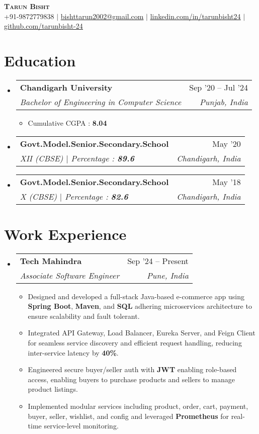 \documentclass[letterpaper,11pt]{article}
\makeatletter
\newcommand{\resumeItem}[1]{
  \item\small{
    {#1 \vspace{-2pt}}
  }
}
\newcommand{\resumeSubheading}[4]{
  \vspace{-2pt}\item
    \begin{tabular*}{0.97\textwidth}[t]{l@{\extracolsep{\fill}}r}
      \textbf{#1} & #2 \\
      \textit{\small#3} & \textit{\small #4} \\
    \end{tabular*}\vspace{-7pt}
}
\newcommand{\resumeSubHeadingListStart}{\begin{itemize}[leftmargin=0.15in, label={}]}
\newcommand{\resumeSubHeadingListEnd}{\end{itemize}}
\newcommand{\resumeItemListStart}{\begin{itemize}}
\newcommand{\resumeItemListEnd}{\end{itemize}\vspace{-5pt}}
\makeatother
\begin{document}
\begin{center}
    \textbf{\Huge \scshape Tarun Bisht} \\ \vspace{1pt}
    \small +91-9872779838 $|$ \href{mailto:bishttarun2002@gmail.com}{bishttarun2002@gmail.com} $|$ 
    \href{https://www.linkedin.com/in/tarunbisht24/}{{\underline{linkedin.com/in/tarunbisht24}}} $|$
    \href{https://github.com/tarunbisht-24}{\underline{github.com/tarunbisht-24}}
\end{center}


\section{Education}
  \resumeSubHeadingListStart
    \resumeSubheading
      {Chandigarh University}{Sep '20 -- Jul '24}
      {Bachelor of Engineering in Computer Science}{Punjab, India}
      \resumeItemListStart
        \resumeItem{Cumulative CGPA : \textbf{8.04}}
      \resumeItemListEnd
    \resumeSubheading
      {Govt.Model.Senior.Secondary.School}{May '20}
      {XII (CBSE) $|$ Percentage : \textbf{89.6}}{Chandigarh, India}
    \resumeSubheading
      {Govt.Model.Senior.Secondary.School}{May '18}
      {X (CBSE) $|$ Percentage : \textbf{82.6}}{Chandigarh, India}
  \resumeSubHeadingListEnd

\section{Work Experience}
  \resumeSubHeadingListStart
    \resumeSubheading
      {Tech Mahindra}{Sep '24 -- Present}
      {Associate Software Engineer}{Pune, India}
          \resumeItemListStart
            \resumeItem{Designed and developed a full-stack Java-based e-commerce app using \textbf{Spring Boot}, \textbf{Maven}, and \textbf{SQL} adhering microservices architecture to ensure scalability and fault tolerant.}
            \resumeItem{Integrated API Gateway, Load Balancer, Eureka Server, and Feign Client for seamless service discovery and efficient request handling, reducing inter-service latency by \textbf{40\%}.}
            \resumeItem{Engineered secure buyer/seller auth with \textbf{JWT} enabling role-based access, enabling buyers to purchase products and sellers to manage product listings.}
             \resumeItem{Implemented modular services including product, order, cart, payment, buyer, seller, wishlist, and config and leveraged \textbf{Prometheus} for real-time service-level monitoring.}
          \resumeItemListEnd
    \resumeSubHeadingListEnd
\end{document}
